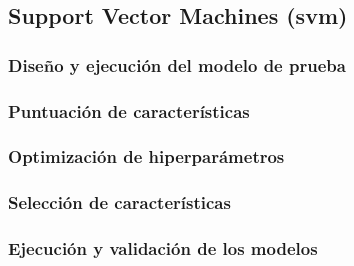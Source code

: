 \subsection{Support Vector Machines (\acrshort{svm})}
\label{sec:svm}




\subsubsection{Diseño y ejecución del modelo de prueba}


\subsubsection{Puntuación de características}

\subsubsection{Optimización de hiperparámetros}







\subsubsection{Selección de características}

\subsubsection{Ejecución y validación de los modelos}